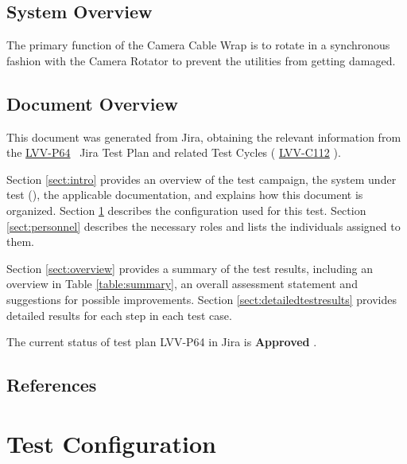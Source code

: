 \documentclass[SE,lsstdraft,STR,toc]{lsstdoc}
\begin{document}
\subsection{System Overview}
\label{sect:systemoverview}

The primary function of the Camera Cable Wrap is to rotate in a
synchronous fashion with the Camera Rotator to prevent the utilities
from getting damaged.


\subsection{Document Overview}
\label{sect:docoverview}

This document was generated from Jira, obtaining the relevant information from the 
\href{https://jira.lsstcorp.org/secure/Tests.jspa#/testPlan/LVV-P64}{LVV-P64}
~Jira Test Plan and related Test Cycles (
  \href{https://jira.lsstcorp.org/secure/Tests.jspa#/testCycle/LVV-C112}{LVV-C112}
).

Section \ref{sect:intro} provides an overview of the test campaign, the system under test (\product{}), the applicable documentation, and explains how this document is organized.
Section \ref{sect:configuration}  describes the configuration used for this test.
Section \ref{sect:personnel} describes the necessary roles and lists the individuals assigned to them.

Section \ref{sect:overview} provides a summary of the test results, including an overview in Table \ref{table:summary}, an overall assessment statement and suggestions for possible improvements.
Section \ref{sect:detailedtestresults} provides detailed results for each step in each test case.

The current status of test plan LVV-P64 in Jira is \textbf{ Approved }.

\subsection{References}
\label{sect:references}
\renewcommand{\refname}{}

\section{Test Configuration}
\label{sect:configuration}
\end{document}
